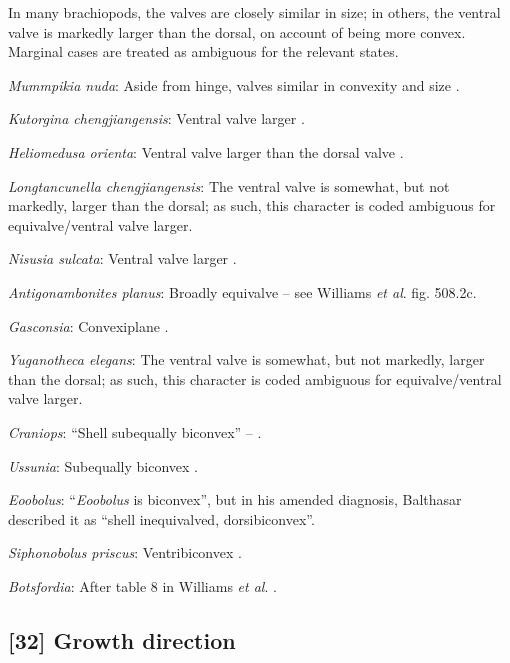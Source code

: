 \documentclass[]{book}
\theoremstyle{definition}
\theoremstyle{definition}
\theoremstyle{definition}
\theoremstyle{remark}
\begin{document}
In many brachiopods, the valves are closely similar in size; in others,
the ventral valve is markedly larger than the dorsal, on account of
being more convex. Marginal cases are treated as ambiguous for the
relevant states.

\emph{Mummpikia nuda}: Aside from hinge, valves similar in convexity and
size \citep{Balthasar2008iMummpikia}.

\emph{Kutorgina chengjiangensis}: Ventral valve larger \citep[see][fig.
125.]{Williams2000BrachiopodaLinguliformea}.

\emph{Heliomedusa orienta}: Ventral valve larger than the dorsal valve
\citep[p.~659]{Zhang2009Architectureand}.

\emph{Longtancunella chengjiangensis}: The ventral valve is somewhat,
but not markedly, larger than the dorsal; as such, this character is
coded ambiguous for equivalve/ventral valve larger.

\emph{Nisusia sulcata}: Ventral valve larger \citep[see][fig.
126.]{Williams2000BrachiopodaLinguliformea}.

\emph{Antigonambonites planus}: Broadly equivalve -- see Williams
\emph{et al}. \citeyearpar{Williams2000BrachiopodaLinguliformea} fig.
508.2c.

\emph{Gasconsia}: Convexiplane
\citep[p.~187]{Williams2000BrachiopodaLinguliformea}.

\emph{Yuganotheca elegans}: The ventral valve is somewhat, but not
markedly, larger than the dorsal; as such, this character is coded
ambiguous for equivalve/ventral valve larger.

\emph{Craniops}: ``Shell subequally biconvex'' --
\citet{Williams2000BrachiopodaLinguliformea}.

\emph{Ussunia}: Subequally biconvex
\citep[p.~192]{Williams2000BrachiopodaLinguliformea}.

\emph{Eoobolus}: ``\emph{Eoobolus} is biconvex'', but in his amended
diagnosis, Balthasar \citeyearpar{Balthasar2009Thebrachiopod} described
it as ``shell inequivalved, dorsibiconvex''.

\emph{Siphonobolus priscus}: Ventribiconvex
\citep{Popov2009Earlyontogeny}.

\emph{Botsfordia}: After table 8 in Williams \emph{et al}.
\citeyearpar{Williams2000BrachiopodaLinguliformea}.

\hypertarget{growth-direction-1}{%
\subsection*{{[}32{]} Growth direction}\label{growth-direction-1}}
\end{document}
